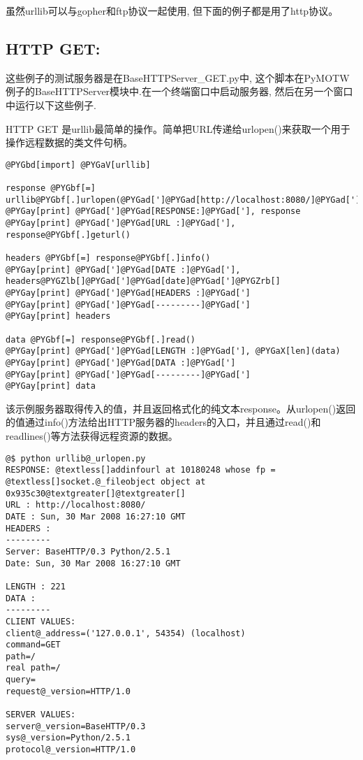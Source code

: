 \documentclass[letterpaper,10pt,english]{manual}
\begin{document}
虽然urllib可以与gopher和ftp协议一起使用, 但下面的例子都是用了http协议。


\subsection{HTTP GET:}

这些例子的测试服务器是在BaseHTTPServer\_GET.py中, 这个脚本在PyMOTW例子的BaseHTTPServer模块中.在一个终端窗口中启动服务器, 然后在另一个窗口中运行以下这些例子.

HTTP GET 是urllib最简单的操作。简单把URL传递给urlopen()来获取一个用于操作远程数据的类文件句柄。

\begin{Verbatim}[commandchars=@\[\]]
@PYGbd[import] @PYGaV[urllib]

response @PYGbf[=] urllib@PYGbf[.]urlopen(@PYGad[']@PYGad[http://localhost:8080/]@PYGad['])
@PYGay[print] @PYGad[']@PYGad[RESPONSE:]@PYGad['], response
@PYGay[print] @PYGad[']@PYGad[URL :]@PYGad['], response@PYGbf[.]geturl()

headers @PYGbf[=] response@PYGbf[.]info()
@PYGay[print] @PYGad[']@PYGad[DATE :]@PYGad['], headers@PYGZlb[]@PYGad[']@PYGad[date]@PYGad[']@PYGZrb[]
@PYGay[print] @PYGad[']@PYGad[HEADERS :]@PYGad[']
@PYGay[print] @PYGad[']@PYGad[---------]@PYGad[']
@PYGay[print] headers

data @PYGbf[=] response@PYGbf[.]read()
@PYGay[print] @PYGad[']@PYGad[LENGTH :]@PYGad['], @PYGaX[len](data)
@PYGay[print] @PYGad[']@PYGad[DATA :]@PYGad[']
@PYGay[print] @PYGad[']@PYGad[---------]@PYGad[']
@PYGay[print] data
\end{Verbatim}

该示例服务器取得传入的值，并且返回格式化的纯文本response。从urlopen()返回的值通过info()方法给出HTTP服务器的headers的入口，并且通过read()和readlines()等方法获得远程资源的数据。

\begin{Verbatim}[commandchars=@\[\]]
@$ python urllib@_urlopen.py
RESPONSE: @textless[]addinfourl at 10180248 whose fp = @textless[]socket.@_fileobject object at 0x935c30@textgreater[]@textgreater[]
URL : http://localhost:8080/
DATE : Sun, 30 Mar 2008 16:27:10 GMT
HEADERS :
---------
Server: BaseHTTP/0.3 Python/2.5.1
Date: Sun, 30 Mar 2008 16:27:10 GMT

LENGTH : 221
DATA :
---------
CLIENT VALUES:
client@_address=('127.0.0.1', 54354) (localhost)
command=GET
path=/
real path=/
query=
request@_version=HTTP/1.0

SERVER VALUES:
server@_version=BaseHTTP/0.3
sys@_version=Python/2.5.1
protocol@_version=HTTP/1.0
\end{Verbatim}
\end{document}
